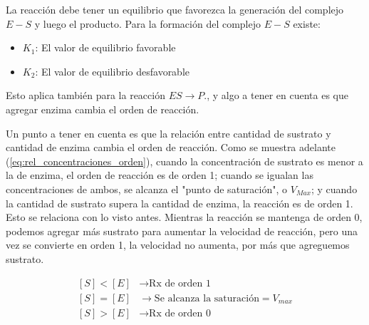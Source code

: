 La reacción debe tener un equilibrio que favorezca la generación del complejo $E-S$ y luego el producto.
Para la formación del complejo $E-S$ existe:

\begin{itemize}
    \item $K_{1}$: El valor de equilibrio favorable
    \item $K_{2}$: El valor de equilibrio desfavorable
\end{itemize}

Esto aplica también para la reacción $ES \longrightarrow P$., y algo a tener en cuenta es que agregar enzima cambia el orden de reacción.

Un punto a tener en cuenta es que la relación entre cantidad de sustrato y cantidad de enzima cambia el orden de reacción. Como se muestra adelante (\autoref{eq:rel_concentraciones_orden}), cuando la concentración de sustrato es menor a la de enzima, el orden de reacción es de orden 1; cuando se igualan las concentraciones de ambos, se alcanza el "punto de saturación", o $V_{Max}$; y cuando la cantidad de sustrato supera la cantidad de enzima, la reacción es de orden 1.
Esto se relaciona con lo visto antes. Mientras la reacción se mantenga de orden 0, podemos agregar más sustrato para aumentar la velocidad de reacción, pero una vez se convierte en orden 1, la velocidad no aumenta, por más que agreguemos sustrato.

\begin{align*}\label{eq:rel_concentraciones_orden}
    [S] < [E] &\longrightarrow \text{Rx de orden 1}
    \\
    [S] = [E] &\longrightarrow \text{Se alcanza la saturación} = V_{max}
    \\
    [S] > [E] &\longrightarrow \text{Rx de orden 0}
\end{align*}